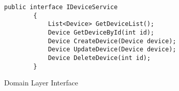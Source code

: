 \begin{figure}[h]
    \begin{lstlisting}[language=CSharp]
        public interface IDeviceService
        {
            List<Device> GetDeviceList();
            Device GetDeviceById(int id);
            Device CreateDevice(Device device);
            Device UpdateDevice(Device device);
            Device DeleteDevice(int id);
        }
    \end{lstlisting}
    \caption{Domain Layer Interface}
    \label{fig:domainLayerInterface}
\end{figure}